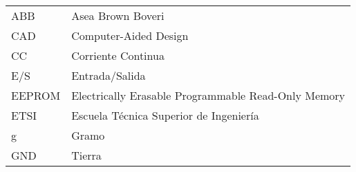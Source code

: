 \chapter*{\notationname}
\pagestyle{especial}
\chaptermark{\notationname}
{}
\begin{longtable}{p{3cm}p{8.5cm}}

ABB & Asea Brown Boveri \\
CAD & Computer-Aided Design \\
CC & Corriente Continua \\
E/S & Entrada/Salida \\
EEPROM & Electrically Erasable Programmable Read-Only Memory\\
ETSI & Escuela Técnica Superior de Ingeniería \\
g & Gramo \\
GND & Tierra \\

\end{longtable}
